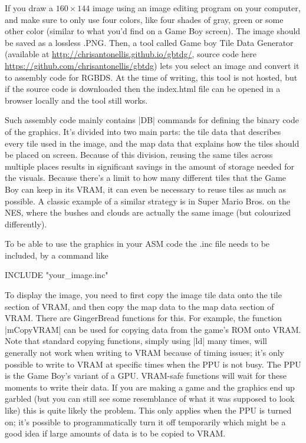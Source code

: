 \documentclass[11pt]{book}
\begin{document}
If you draw a $160\times144$ image using an image editing program on your computer, and make sure to only use four colors, like four shades of gray, green or some other color (similar to what you'd find on a Game Boy screen). The image should be saved as a lossless .PNG. Then, a tool called Game boy Tile Data Generator (available at \url{http://chrisantonellis.github.io/gbtdg/}, source code here \url{https://github.com/chrisantonellis/gbtdg}) lets you select an image and convert it to assembly code for RGBDS. At the time of writing, this tool is not hosted, but if the source code is downloaded then the index.html file can be opened in a browser locally and the tool still works.

Such assembly code mainly contains |DB| commands for defining the binary code of the graphics. It's divided into two main parts: the tile data that describes every tile used in the image, and the map data that explains how the tiles should be placed on screen. Because of this division, reusing the same tiles across multiple places results in significant savings in the amount of storage needed for the visuals. Because there's a limit to how many different tiles that the Game Boy can keep in its VRAM, it can even be necessary to reuse tiles as much as possible. A classic example of a similar strategy is in Super Mario Bros. on the NES, where the bushes and clouds are actually the same image (but colourized differently).

To be able to use the graphics in your ASM code the .inc file needs to be included, by a command like

\begin{code}
INCLUDE "your_image.inc"
\end{code}

To display the image, you need to first copy the image tile data onto the tile section of VRAM, and then copy the map data to the map data section of VRAM. There are GingerBread functions for this. For example, the function |mCopyVRAM| can be used for copying data from the game's ROM onto VRAM. Note that standard copying functions, simply using |ld| many times, will generally not work when writing to VRAM because of timing issues; it's only possible to write to VRAM at specific times when the PPU is not busy. The PPU is the Game Boy's variant of a GPU. VRAM-safe functions will wait for these moments to write their data. If you are making a game and the graphics end up garbled (but you can still see some resemblance of what it was supposed to look like) this is quite likely the problem. This only applies when the PPU is turned on; it's possible to programmatically turn it off temporarily which might be a good idea if large amounts of data is to be copied to VRAM.
\end{document}
